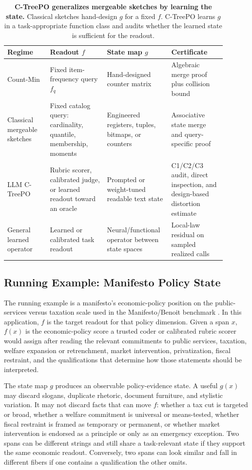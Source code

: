 \begin{table}[t]
\centering
\small
\renewcommand{\arraystretch}{1.13}
\begin{tabular}{L{0.18\linewidth}L{0.24\linewidth}L{0.24\linewidth}L{0.23\linewidth}}
\hline
Regime & Readout $f$ & State map $g$ & Certificate \\
\hline
Count-Min & Fixed item-frequency query $f_q$ & Hand-designed counter matrix & Algebraic merge proof plus collision bound \\
Classical mergeable sketches & Fixed catalog query: cardinality, quantile, membership, moments & Engineered registers, tuples, bitmaps, or counters & Associative state merge and query-specific proof \\
LLM C-TreePO & Rubric scorer, calibrated judge, or learned readout toward an oracle & Prompted or weight-tuned readable text state & C1/C2/C3 audit, direct inspection, and design-based distortion estimate \\
General learned operator & Learned or calibrated task readout & Neural/functional operator between state spaces & Local-law residual on sampled realized calls \\
\hline
\end{tabular}
\caption{\textbf{C-TreePO generalizes mergeable sketches by learning the
state.} Classical sketches hand-design $g$ for a fixed $f$. C-TreePO learns
$g$ in a task-appropriate function class and audits whether the learned state
is sufficient for the readout.}
\label{tab:v5-learned-sketch-lineage}
\end{table}

\subsection{Running Example: Manifesto Policy State}

The running example is a manifesto's economic-policy position on the
public-services versus taxation scale used in the Manifesto/Benoit benchmark
\citep{BenoitEtAl2025,ManifestoProject2025a}. In this application, $f$ is the
target readout for that policy dimension. Given a span $x$, $f(x)$ is the
economic-policy score a trusted coder or calibrated rubric scorer would assign
after reading the relevant commitments to public services, taxation, welfare
expansion or retrenchment, market intervention, privatization, fiscal
restraint, and the qualifications that determine how those statements should
be interpreted.

The state map $g$ produces an observable policy-evidence state. A useful
$g(x)$ may discard slogans, duplicate rhetoric, document furniture, and
stylistic variation. It may not discard facts that can move $f$: whether a
tax cut is targeted or broad, whether a welfare commitment is universal or
means-tested, whether fiscal restraint is framed as temporary or permanent,
or whether market intervention is endorsed as a principle or only as an
emergency exception. Two spans can be different strings and still share a
task-relevant state if they support the same economic readout. Conversely,
two spans can look similar and fall in different fibers if one contains a
qualification the other omits.

